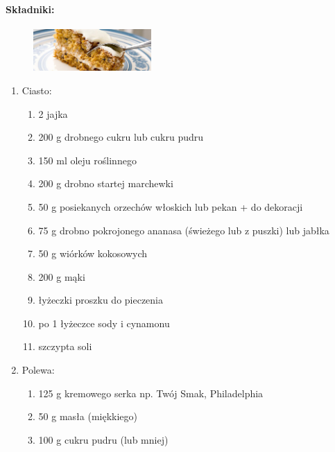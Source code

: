 \documentclass{article}
\begin{document}
    \paragraph{Składniki:}
    \begin{figure}
        \includegraphics[width=0.4\textwidth]{ciasto_marchewkowe.jpg}
    \end{figure}
    \begin{enumerate}
        \item Ciasto:
            \begin{enumerate}
                \item 2 jajka
                \item 200 g drobnego cukru lub cukru pudru
                \item 150 ml oleju roślinnego
                \item 200 g drobno startej marchewki
                \item 50 g posiekanych orzechów włoskich lub pekan + do dekoracji
                \item 75 g drobno pokrojonego ananasa (świeżego lub z puszki) lub jabłka
                \item 50 g wiórków kokosowych
                \item 200 g mąki
                \item {} łyżeczki proszku do pieczenia
                \item po 1 łyżeczce sody i cynamonu
                \item szczypta soli
            \end{enumerate}
        \item Polewa:
            \begin{enumerate}
                \item 125 g kremowego serka np. Twój Smak, Philadelphia
                \item 50 g masła (miękkiego)
                \item 100 g cukru pudru (lub mniej)
            \end{enumerate}
    \end{enumerate}
\end{document}
